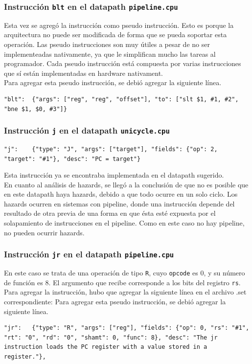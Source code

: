 \documentclass[a4paper,10pt]{article}
\begin{document}
\subsubsection{Instrucción \texttt{blt} en el datapath \texttt{pipeline.cpu}}
Esta vez se agregó la instrucción como pseudo instrucción. Esto es porque la arquitectura no puede ser modificada de forma que se pueda soportar esta operación. Las pseudo instrucciones son muy útiles a pesar de no ser implementeadas nativamente, ya que le simplifican mucho las tareas al programador. Cada pseudo instrucción está compuesta por varias instrucciones que sí están implementadas en hardware nativament. \\
Para agregar esta pseudo instrucción, se debió agregar la siguiente línea. 
\begin{lstlisting}[breaklines=true]
"blt":  {"args": ["reg", "reg", "offset"], "to": ["slt $1, #1, #2", "bne $1, $0, #3"]}
\end{lstlisting}

\subsubsection{Instrucción \texttt{j} en el datapath \texttt{unicycle.cpu}}
\begin{lstlisting}[breaklines=true]
"j":    {"type": "J", "args": ["target"], "fields": {"op": 2, "target": "#1"}, "desc": "PC = target"}
\end{lstlisting}
Esta instrucción ya se encontraba implementada en el datapath sugerido. \\
En cuanto al análisis de hazards, se llegó a la conclusión de que no es posible que en este datapath haya hazards, debido a que todo ocurre en un solo ciclo. Los hazards ocurren en sistemas con pipeline, donde una instrucción depende del resultado de otra previa de una forma en que ésta esté expuesta por el solapamiento de instrucciones en el pipeline. Como en este caso no hay pipeline, no pueden ocurrir hazards.

\subsubsection{Instrucción \texttt{jr} en el datapath \texttt{pipeline.cpu}}
En este caso se trata de una operación de tipo \texttt{R}, cuyo \texttt{opcode} es 0, y su número de función es 8. El argumento que recibe corresponde a los bits del registro \texttt{rs}. \\
Para agregar la instrucción, hubo que agregar la siguiente línea en el archivo .set correspondiente: 
Para agregar esta pseudo instrucción, se debió agregar la siguiente línea. 
\begin{lstlisting}[breaklines=true]
"jr":   {"type": "R", "args": ["reg"], "fields": {"op": 0, "rs": "#1", "rt": "0", "rd": "0", "shamt": 0, "func": 8}, "desc": "The jr instruction loads the PC register with a value stored in a register."},
\end{lstlisting}
\end{document}
